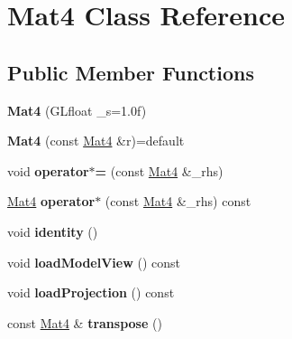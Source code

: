 \hypertarget{classMat4}{}\section{Mat4 Class Reference}
\label{classMat4}
\subsection*{Public Member Functions}
\begin{DoxyCompactItemize}
\item 
{\bfseries Mat4} (G\+Lfloat \+\_\+s=1.\+0f)\hypertarget{classMat4_ae851bfadb8c8bec37790dd3ffe03a126}{}\label{classMat4_ae851bfadb8c8bec37790dd3ffe03a126}

\item 
{\bfseries Mat4} (const \hyperlink{classMat4}{Mat4} \&r)=default\hypertarget{classMat4_ac1cd126926de151f53dfd568afce1152}{}\label{classMat4_ac1cd126926de151f53dfd568afce1152}

\item 
void {\bfseries operator$\ast$=} (const \hyperlink{classMat4}{Mat4} \&\+\_\+rhs)\hypertarget{classMat4_a5b8ca6003dee9d49f2a008f1608bebaf}{}\label{classMat4_a5b8ca6003dee9d49f2a008f1608bebaf}

\item 
\hyperlink{classMat4}{Mat4} {\bfseries operator$\ast$} (const \hyperlink{classMat4}{Mat4} \&\+\_\+rhs) const \hypertarget{classMat4_a354d63d327510ae7ebbf8008e355239d}{}\label{classMat4_a354d63d327510ae7ebbf8008e355239d}

\item 
void {\bfseries identity} ()\hypertarget{classMat4_ad4a8d1caecbfd18a61a9fe245e7463ab}{}\label{classMat4_ad4a8d1caecbfd18a61a9fe245e7463ab}

\item 
void {\bfseries load\+Model\+View} () const \hypertarget{classMat4_ab8a59432b5fa5ee98e336ce0b6aa1535}{}\label{classMat4_ab8a59432b5fa5ee98e336ce0b6aa1535}

\item 
void {\bfseries load\+Projection} () const \hypertarget{classMat4_a421fdc614bb0b3e7346371aed1cf900c}{}\label{classMat4_a421fdc614bb0b3e7346371aed1cf900c}

\item 
const \hyperlink{classMat4}{Mat4} \& {\bfseries transpose} ()\hypertarget{classMat4_aafdeef571f94c91cb45bb5631eef2a0e}{}\label{classMat4_aafdeef571f94c91cb45bb5631eef2a0e}

\end{DoxyCompactItemize}
